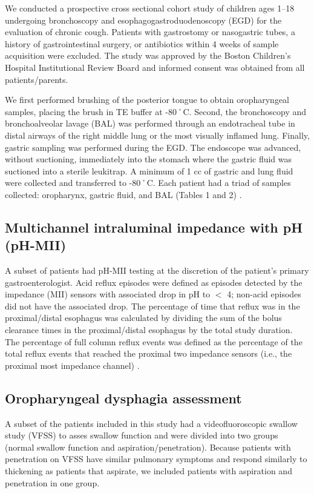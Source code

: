 We conducted a prospective cross sectional cohort study of children ages 1--18 undergoing bronchoscopy and esophagogastroduodenoscopy (EGD) for the evaluation of chronic cough.
Patients with gastrostomy or nasogastric tubes, a history of gastrointestinal surgery, or antibiotics within 4 weeks of sample acquisition were excluded.
The study was approved by the Boston Children's Hospital Institutional Review Board and informed consent was obtained from all patients/parents.

We first performed brushing of the posterior tongue to obtain oropharyngeal samples, placing the brush in TE buffer at -80˚C.
Second, the bronchoscopy and bronchoalveolar lavage (BAL) was performed through an endotracheal tube in distal airways of the right middle lung or the most visually inflamed lung.
Finally, gastric sampling was performed during the EGD.
The endoscope was advanced, without suctioning, immediately into the stomach where the gastric fluid was suctioned into a sterile leukitrap.
A minimum of 1 cc of gastric and lung fluid were collected and transferred to -80˚C.
Each patient had a triad of samples collected: oropharynx, gastric fluid, and BAL (Tables 1 and 2) \cite{rosen2015ppi}.

\subsection{Multichannel intraluminal impedance with pH (pH-MII)}

A subset of patients had pH-MII testing at the discretion of the patient's primary gastroenterologist.
Acid reflux episodes were defined as episodes detected by the impedance (MII) sensors with associated drop in pH to $<$ 4; non-acid episodes did not have the associated drop.
The percentage of time that reflux was in the proximal/distal esophagus was calculated by dividing the sum of the bolus clearance times in the proximal/distal esophagus by the total study duration.
The percentage of full column reflux events was defined as the percentage of the total reflux events that reached the proximal two impedance sensors (i.e., the proximal most impedance channel) \cite{rosen2004impedance}.

\subsection{Oropharyngeal dysphagia assessment}

A subset of the patients included in this study had a videofluoroscopic swallow study (VFSS) to asses swallow function and were divided into two groups (normal swallow function and aspiration/penetration).
Because patients with penetration on VFSS have similar pulmonary symptoms and respond similarly to thickening as patients that aspirate, we included patients with aspiration and penetration in one group.

